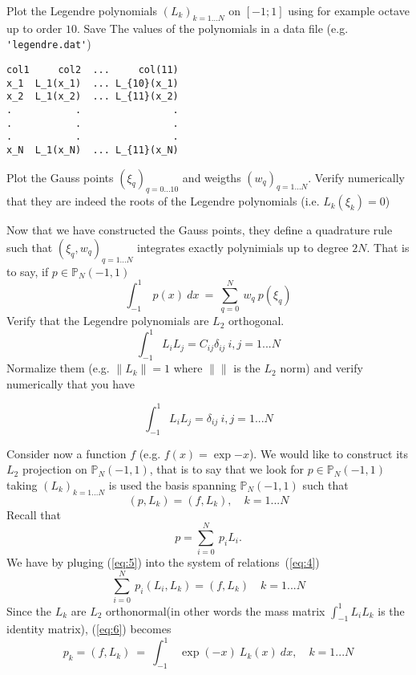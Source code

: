 \documentclass{article}
\begin{document}
\begin{Answer}[title={p type Galerkin method in 1D}]
  
  \Question Plot the Legendre polynomials $(L_k)_{k=1...N}$ on
  $[-1;1]$ using for example octave up to order $10$. Save The values
  of the polynomials in a data file (e.g. \verb+'legendre.dat'+)
\begin{verbatim}
col1     col2  ...     col(11)
x_1  L_1(x_1)  ... L_{10}(x_1)
x_2  L_1(x_2)  ... L_{11}(x_2)
.           .                .
.           .                .
.           .                .
x_N  L_1(x_N)  ... L_{11}(x_N)
\end{verbatim}

  \Question Plot the Gauss points $(\xi_q)_{q=0...10}$ and weigths
  $(w_q)_{q=1...N}$. Verify numerically that they are indeed the roots
  of the Legendre polynomials (i.e. $L_k(\xi_k) = 0$)
  
  \Question Now that we have constructed the Gauss points, they define
  a quadrature rule such that $(\xi_q,w_q)_{q=1...N}$ integrates
  exactly polynimials up to degree $2N$. That is to say, if $p \in \mathbb{P}_N(-1,1)$
  \begin{equation}
    \label{eq:1}
    \int_{-1}^1\ p(x)\ dx\ =\ \sum_{q=0}^N\ w_q\ p( \xi_q )
  \end{equation}
  \subQuestion Verify that the Legendre polynomials are $L_2$ orthogonal. 
  \begin{equation}
    \label{eq:3}
    \int_{-1}^1 L_i L_j = C_{ij} \delta_{ij}\ i,j=1...N
  \end{equation}
  \subQuestion Normalize them (e.g. $\|L_k\| = 1$ where $\|\|$ is the
  $L_2$ norm) and verify numerically that you have
  
  \begin{equation}
    \label{eq:2}
    \int_{-1}^1 L_i L_j =  \delta_{ij}\ i,j=1...N
  \end{equation}
  
  \ExePart 
   Consider now a function $f$ (e.g. $f(x)=\exp{-x}$). We
  would like to construct its $L_2$ projection on
  $\mathbb{P}_N(-1,1)$, that is to say that we look for $p \in
  \mathbb{P}_N(-1,1)$ taking $(L_k)_{k=1...N}$ is used the basis spanning
  $\mathbb{P}_N(-1,1)$ such that
  \begin{equation}
    \label{eq:4}
    (p, L_k) = (f, L_k), \quad k=1...N
  \end{equation}
  Recall that 
  \begin{equation}
    \label{eq:5}
    p=\sum_{i=0}^N\ p_i L_i.
  \end{equation}
  We have by pluging (\ref{eq:5}) into the system of relations~(\ref{eq:4})
  \begin{equation}
    \label{eq:6}
    \sum_{i=0}^N\ p_i (L_i,L_k) = (f, L_k)\quad k=1...N
  \end{equation}
  Since the $L_k$ are $L_2$ orthonormal(in other words the mass matrix
  $\int_{-1}^1 L_i L_k$ is the identity matrix), (\ref{eq:6}) becomes
  \begin{equation}
    \label{eq:7}
    p_k = (f, L_k)\ =\ \int_{-1}^1\ \exp(-x)\ L_k(x)\ dx, \quad k=1...N
  \end{equation}


\end{Answer}
\end{document}
